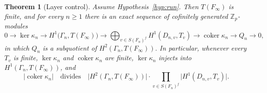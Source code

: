 \documentclass[11pt]{article}
\newtheorem{theorem}{Theorem}[section]
\theoremstyle{definition}
\theoremstyle{remark}
\newcommand{\Z}{\mathbb{Z}}
\newcommand{\coker}{\operatorname{coker}}
\begin{document}
\begin{theorem}[Layer control]
\label{thm:control}
Assume Hypothesis~\ref{hyp:run}. Then \(T(F_\infty)\) is finite, and for every \(n\ge 1\) there is an exact sequence of cofinitely generated \(\Z_p\)-modules
\begin{equation}
\label{eq:snake}
0\to\ker\kappa_n\to
H^1\bigl(\Gamma_n,T(F_\infty)\bigr)
\to
\bigoplus_{v\in S(F_n)^{f}}
H^1(D_{n,v},T_v)
\to
\coker\kappa_n
\to
Q_n
\to 0,
\end{equation}
in which \(Q_n\) is a subquotient of \(H^2(\Gamma_n,T(F_\infty))\). In particular, whenever every \(T_v\) is finite, \(\ker\kappa_n\) and \(\coker\kappa_n\) are finite, \(\ker\kappa_n\) injects into \(H^1(\Gamma_n,T(F_\infty))\), and
\[
\bigl|\coker\kappa_n\bigr|
\quad\text{divides}\quad
\bigl|H^2(\Gamma_n,T(F_\infty))\bigr|
\cdot
\prod_{v\in S(F_n)^{f}}
\bigl|H^1(D_{n,v},T_v)\bigr|.
\]
\end{theorem}
\end{document}
